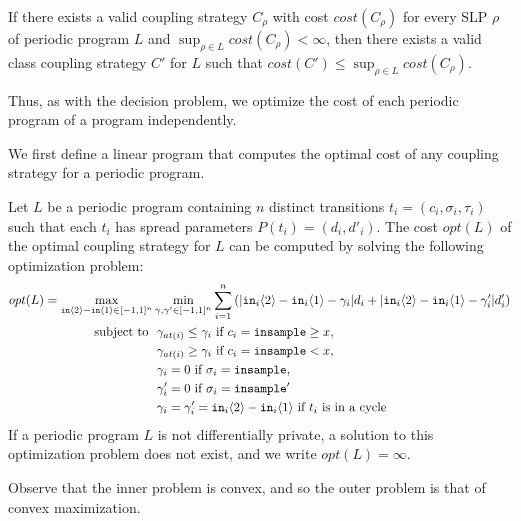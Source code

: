 \begin{prop}\label{ClassCouplingStrategiesAreEnoughProp}
    If there exists a valid coupling strategy $C_\rho$ with cost $cost(C_\rho)$ for every SLP $\rho$ of periodic program $L$ and $\sup_{\rho\in L}cost(C_\rho)< \infty$, then there exists a valid class coupling strategy $C'$ for $L$ such that $cost(C') \leq \sup_{\rho\in L}cost(C_\rho)$. 
\end{prop}

Thus, as with the decision problem, we optimize the cost of each periodic program of a program independently.

We first define a linear program that computes the optimal cost of any coupling strategy for a periodic program. 

\begin{prop}
    \label{prop:compute_opt_cost}
    Let $L$ be a periodic program containing $n$ distinct transitions $t_i = (c_i, \sigma_i, \tau_i)$ such that each $t_i$ has spread parameters $P(t_i) = (d_i, d'_i)$. The cost $opt(L)$ of the optimal coupling strategy for $L$ can be computed by solving the following optimization problem: 
    \begin{align*}
        opt(L) = \max_{\texttt{in}\langle2 \rangle-\texttt{in}\langle1 \rangle \in [-1, 1]^n} &\min_{\gamma, \gamma' \in [-1, 1]^n} \sum_{i = 1}^n \left(|\texttt{in}_i\langle2 \rangle-\texttt{in}_i\langle1 \rangle - \gamma_i| d_i + |\texttt{in}_i\langle2 \rangle-\texttt{in}_i\langle1 \rangle - \gamma_i'|d_i' \right)\\ 
            \text{subject to }
            &\ \gamma_{at(i)} \leq \gamma_i \text{ if } c_i = \texttt{insample}\geq x, \\
            &\ \gamma_{at(i)} \geq \gamma_i \text{ if } c_i = \texttt{insample} < x, \\
            &\ \gamma_i = 0 \text{ if } \sigma_i = \texttt{insample}, \\
            &\ \gamma_i' = 0 \text{ if } \sigma_i = \texttt{insample}'\\
            &\ \gamma_i = \gamma_i'= \texttt{in}_i\langle2 \rangle-\texttt{in}_i\langle1 \rangle \text{ if } t_i \text{ is in a cycle}
    \end{align*}
    If a periodic program $L$ is not differentially private, a solution to this optimization problem does not exist, and we write $opt(L) = \infty$.
\end{prop}

Observe that the inner problem is convex, and so the outer problem is that of convex maximization. 

